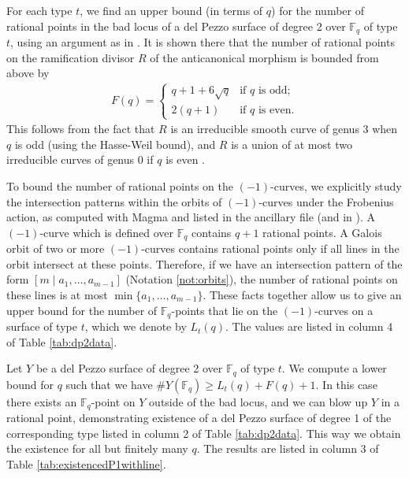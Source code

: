 \documentclass[a4paper, 11pt, reqno]{amsart}
\numberwithin{equation}{section} \numberwithin{figure}{section}
\def \F {{\mathbb F}}
\def \Z {{\mathbb Z}}
\theoremstyle{definition}
\numberwithin{lemma}{section}
\begin{document}
For each type $t$, we find an upper bound (in terms of $q$) for the number of rational points in the bad locus of a del Pezzo surface of degree 2 over $\F_q$ of type $t$, using an argument as in \cite[15]{BFL}. It is shown there that the number of rational points on the ramification divisor $R$ of the anticanonical morphism is bounded from above by
\begin{align}
    F(q) = \begin{cases}
    q + 1 + 6 \sqrt{q} & \text{if $q$ is odd;}\\
    2(q + 1) &\text{if $q$ is even.}
    \end{cases}
\end{align}
This follows from the fact that $R$ is an irreducible smooth curve of genus 3 when $q$ is odd (using the Hasse-Weil bound), and $R$ is a union of at most two irreducible curves of genus 0 if $q$ is even \cite[Lemma 4.1]{BFL}. 

To bound the number of rational points on the $(-1)$-curves, we explicitly study the intersection patterns within the orbits of $(-1)$-curves under the Frobenius action, as computed with Magma and listed in the ancillary file (and in \cite{github_Existence_dP1}). A $(-1)$-curve which is defined over $\F_q$ contains $q + 1$ rational points. A Galois orbit of two or more $(-1)$-curves contains rational points only if all lines in the orbit intersect at these points. Therefore, if we have an intersection pattern of the form $[m \mid a_1, \ldots, a_{m-1}]$ (Notation \ref{not:orbits}), the number of rational points on these lines is at most $\min\{a_1, \ldots, a_{m-1}\}$. These facts together allow us to give an upper bound for the number of $\F_q$-points that lie on the $(-1)$-curves on a surface of type $t$, which we denote by $L_t(q)$. The values are listed in column 4 of Table \ref{tab:dp2data}. 

Let $Y$ be a del Pezzo surface of degree 2 over $\F_q$ of type $t$. We compute \cite{github_Existence_dP1} a lower bound for $q$ such that we have $\#Y(\F_q) \geq L_t(q) + F(q) + 1$. In this case there exists an $\F_q$-point on $Y$ outside of the bad locus, and we can blow up $Y$ in a rational point, demonstrating existence of a del Pezzo surface of degree 1 of the corresponding type listed in column 2 of Table \ref{tab:dp2data}. This way we obtain the existence for all but finitely many $q$. The results are listed in column 3 of Table \ref{tab:existencedP1withline}. 

\end{document}
